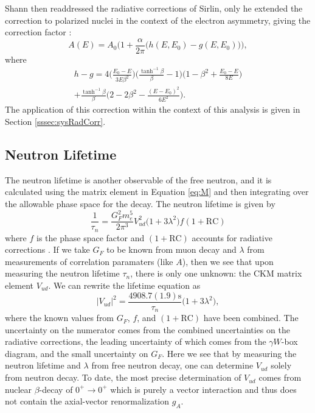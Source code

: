 Shann then readdressed the radiative corrections of Sirlin, only he extended the
correction to polarized nuclei in the context of the electron asymmetry,
giving the correction factor \cite{shann1971}:
%
\begin{equation}
  A(E) = A_0\bigg(1+\frac{\alpha}{2\pi}\Big(h(E,E_0)-g(E,E_0)\Big)\bigg),
\end{equation}
where
\begin{multline}
  h-g = 4 \bigg( \frac{E_0-E}{3E\beta^2} \bigg)
  \bigg( \frac{\tanh^{-1}\beta}{\beta}-1 \bigg)
  \bigg(1-\beta^2+ \frac{E_0-E}{8E} \bigg) \\
  + \frac{\tanh^{-1}\beta}{\beta}
  \bigg( 2-2\beta^2-\frac{\left(E-E_0\right)^2}{6E^2} \bigg).
\end{multline}
%
The application of this correction within the context of this analysis is given in
Section \ref{sssec:sysRadCorr}.

\subsection{Neutron Lifetime}
The neutron lifetime is another observable of the free neutron, and it is calculated using the matrix
element in Equation \ref{eq:M} and then integrating over the allowable phase space for the decay.
The neutron lifetime is given by
%
\begin{equation}
  \frac{1}{\tau_n} = \frac{G_F^2 m_e^5}{2\pi^3}V_{ud}^2 \big(1+3\lambda^2)f(1+\mathrm{RC})
\end{equation}
%
where $f$ is the phase space factor and $(1+\mathrm{RC})$ accounts for radiative
corrections \cite{czarnecki2004precision,marciano2006}. If we take $G_F$ to be known from muon decay and $\lambda$ from
measurements of correlation paramaters (like $A$), then we see that upon measuring the
neutron lifetime $\tau_n$, there is only one unknown: the CKM matrix element $V_{ud}$.
We can rewrite the lifetime equation as
%
\begin{equation}
  |V_{ud}|^2 = \frac{4908.7(1.9)\mathrm{s}}{\tau_n}\big(1+3\lambda^2\big),
\end{equation}
where the known values from $G_F$, $f$, and $(1+\mathrm{RC})$ have been combined.
The uncertainty on the numerator comes from the combined uncertainties on
the radiative corrections, the leading uncertainty of which comes from
the $\gamma W$-box diagram, and the small uncertainty on $G_F$. Here we see that
by measuring the neutron lifetime and $\lambda$ from free neutron decay,
one can determine $V_{ud}$ solely from neutron decay. 
To date, the most precise determination of $V_{ud}$ comes from nuclear
$\beta$-decay of $0^+ \rightarrow 0^+$ which is purely a vector interaction
and thus does not contain the axial-vector renormalization $g_A$.




